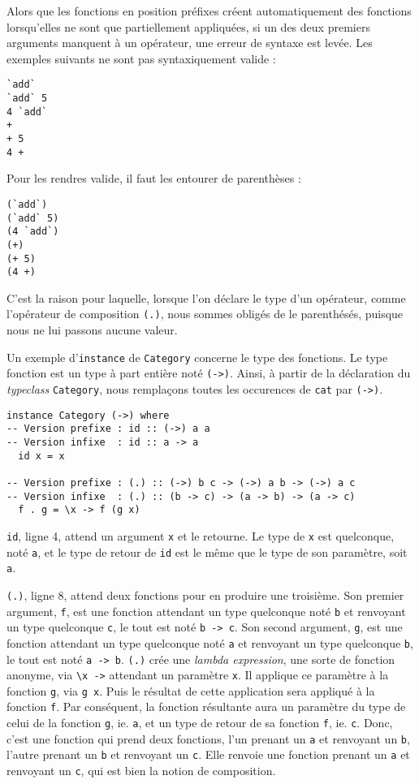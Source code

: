 \documentclass{llncs}
\begin{document}
Alors que les fonctions en position préfixes créent automatiquement des fonctions
lorsqu'elles ne sont que partiellement appliquées, si un des deux premiers arguments
manquent à un opérateur, une erreur de syntaxe est levée.
Les exemples suivants ne sont pas syntaxiquement valide :
\begin{lstlisting}
`add`
`add` 5
4 `add`
+
+ 5
4 +
\end{lstlisting}

Pour les rendres valide, il faut les entourer de parenthèses :
\begin{lstlisting}
(`add`)
(`add` 5)
(4 `add`)
(+)
(+ 5)
(4 +)
\end{lstlisting}

C'est la raison pour laquelle, lorsque l'on déclare le type d'un opérateur, comme
l'opérateur de composition \lstinline{(.)}, nous sommes obligés de le parenthésés,
puisque nous ne lui passons aucune valeur.

Un exemple d'\lstinline{instance} de \lstinline{Category} concerne le type des fonctions.
Le type fonction est un type à part entière noté \lstinline{(->)}.
Ainsi, à partir de la déclaration du \emph{typeclass} \lstinline{Category}, nous
remplaçons toutes les occurences de \lstinline{cat} par \lstinline{(->)}.
\begin{lstlisting}
instance Category (->) where
-- Version prefixe : id :: (->) a a
-- Version infixe  : id :: a -> a
  id x = x

-- Version prefixe : (.) :: (->) b c -> (->) a b -> (->) a c
-- Version infixe  : (.) :: (b -> c) -> (a -> b) -> (a -> c)
  f . g = \x -> f (g x)
\end{lstlisting}

\lstinline{id}, ligne 4, attend un argument \lstinline{x} et le retourne.
Le type de \lstinline{x} est quelconque, noté \lstinline{a}, et le type de retour
de \lstinline{id} est le même que le type de son paramètre, soit \lstinline{a}.

\lstinline{(.)}, ligne 8, attend deux fonctions pour en produire une troisième.
Son premier argument, \lstinline{f}, est une fonction attendant un type quelconque
noté \lstinline{b} et renvoyant un type quelconque \lstinline{c}, le tout est
noté \lstinline{b -> c}.
Son second argument, \lstinline{g}, est une fonction attendant un type quelconque
noté \lstinline{a} et renvoyant un type quelconque \lstinline{b}, le tout est
noté \lstinline{a -> b}.
\lstinline{(.)} crée une \emph{lambda expression}, une sorte de fonction anonyme,
via \lstinline{\x ->} attendant un paramètre \lstinline{x}.
Il applique ce paramètre à la fonction \lstinline{g}, via \lstinline{g x}.
Puis le résultat de cette application sera appliqué à la fonction \lstinline{f}.
Par conséquent, la fonction résultante aura un paramètre du type de celui de la
fonction \lstinline{g}, ie. \lstinline{a}, et un type de retour de sa fonction \lstinline{f},
ie. \lstinline{c}.
Donc, c'est une fonction qui prend deux fonctions, l'un prenant un \lstinline{a}
et renvoyant un \lstinline{b}, l'autre prenant un \lstinline{b} et renvoyant un \lstinline{c}.
Elle renvoie une fonction prenant un \lstinline{a} et renvoyant un \lstinline{c},
qui est bien la notion de composition.
\end{document}
